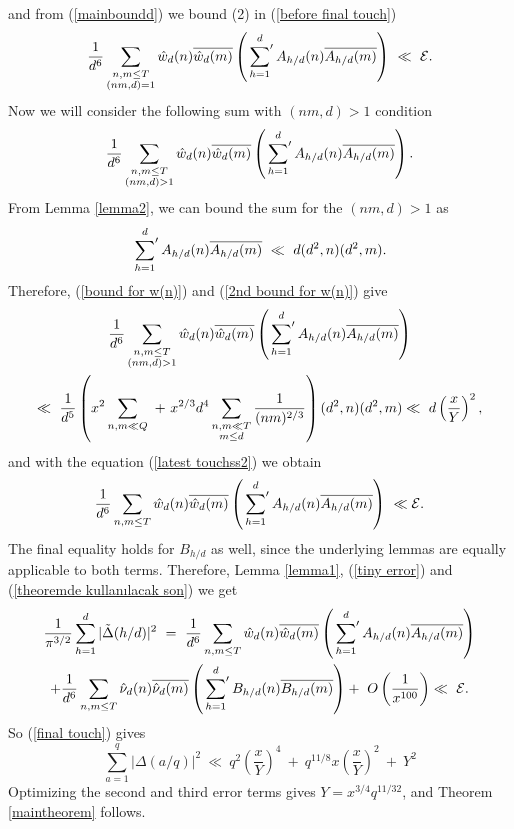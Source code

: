 \documentclass[oneside,reqno,10pt]{amsart}
\numberwithin{equation}{section}
\theoremstyle{plain}
\theoremstyle{definition}
\numberwithin{equation}{section}
\begin{document}
and from (\ref{mainboundd}) we bound (2) in (\ref{before final touch}) 
\begin{align}\label{latest touchss2}
     \frac{1}{d^6} \sum_{\substack{n,m\leq T\\(nm,d)=1}} \hat{w}_d(n)\overline{\hat{w}_d(m)}\left(\sideset{}{'}\sum\limits_{h=1}^dA_{h/d}(n)\overline{A_{h/d}(m)}\right)\ \ll \ \mathcal{E}.
\end{align}
Now we will consider the following sum with  $(nm,d)>1$ condition
\begin{equation*}
     \frac{1}{d^6} \sum_{\substack{n,m\leq T\\(nm,d)>1}} \hat{w}_d(n)\overline{\hat{w}_d(m)}\left(\sideset{}{'}\sum\limits_{h=1}^dA_{h/d}(n)\overline{A_{h/d}(m)}\right).
\end{equation*}
From Lemma \ref{lemma2}, we can bound the sum for the $(nm,d)>1$ as
\begin{equation*}
    \sideset{}{'}\sum\limits_{h=1}^dA_{h/d}(n)\overline{A_{h/d}(m)}\ \ll\ d(d^2,n)(d^2,m).
\end{equation*}
Therefore, (\ref{bound for w(n)}) and (\ref{2nd bound for w(n)}) give
\begin{multline*}
   \frac{1}{d^6} \sum_{\substack{n,m\leq T\\(nm,d)>1}} \hat{w}_d(n)\overline{\hat{w}_d(m)}\left(\sideset{}{'}\sum\limits_{h=1}^dA_{h/d}(n)\overline{A_{h/d}(m)}\right)\\
   \ll \ \frac{1}{d^5}\left(x^2\sum_{\substack{n,m\ll Q}}\ +\ x^{2/3}d^4\sum_{\substack{n,m\ll T\\m\leq d}} \frac{1}{(nm)^{2/3}}\right)(d^2,n)(d^2,m)
   \ll\ d\left(\frac{x}{Y}\right)^2,
\end{multline*}
and with the equation (\ref{latest touchss2}) we obtain
\begin{equation}\label{theoremde kullanılacak son}
     \frac{1}{d^6} \sum_{\substack{n,m\leq T}} \hat{w}_d(n)\overline{\hat{w}_d(m)}\left(\sideset{}{'}\sum\limits_{h=1}^dA_{h/d}(n)\overline{A_{h/d}(m)}\right)\ \ll \mathcal{E}.
\end{equation}
The final equality holds for $B_{h/d}$ as well, since the underlying lemmas are equally applicable to both terms. Therefore, Lemma \ref{lemma1}, (\ref{tiny error}) and (\ref{theoremde kullanılacak son}) we get
\begin{multline*}
    \frac{1}{\pi^{3/2}}\sum\limits_{h=1}^{d}|\tilde{\Delta}(h/d)|^2 \ =\ \frac{1}{d^6} \sum_{\substack{n,m\leq T}} \hat{w}_d(n)\overline{\hat{w}_d(m)}\left(\sideset{}{'}\sum\limits_{h=1}^dA_{h/d}(n)\overline{A_{h/d}(m)}\right)\\
    +\frac{1}{d^6} \sum_{\substack{n,m\leq T}} \hat{\nu}_d(n)\overline{\hat{\nu}_d(m)}\left(\sideset{}{'}\sum\limits_{h=1}^dB_{h/d}(n)\overline{B_{h/d}(m)}\right)
    +\ O\left(\frac{1}{x^{100}}\right)
    \ll\ \mathcal{E}. 
\end{multline*}
So (\ref{final touch}) gives 
\begin{equation*}
    \sum_{a=1}^{q}|\Delta(a/q)|^2\ \ll\ q^2\left(\frac{x}{Y}\right)^4\ +\ q^{11/8}x\left(\frac{x}{Y}\right)^2\ +\ Y^2
\end{equation*}
Optimizing the second and third error terms gives $ Y=x^{3/4}q^{11/32}$, and Theorem \ref{maintheorem} follows.
\end{document}
